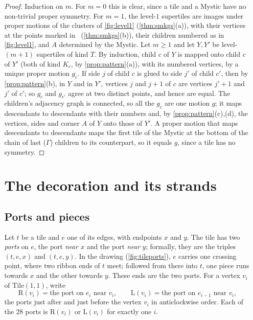 \documentclass[11pt]{amsart}
\theoremstyle{definition}
\theoremstyle{remark}
\newcommand{\Tile}{\mathrm{Tile}(1,1)}
\newcommand{\Lp}{\mathrm L}
\newcommand{\Rp}{\mathrm R}
\begin{document}
\begin{proof}
Induction on $m$. For $m=0$ this is clear, since a tile and a Mystic have no non-trivial proper symmetry. For $m=1$,
the level-$1$ supertiles are images under proper motions of the clusters of \cref{fig:level1} (\cref{thm:smkgs}(a)),
with their vertices at the points marked in~\cite[Fig.~4.1]{SMKGS-spectre} (\cref{thm:smkgs}(b)), their children
numbered as in
\cref{fig:level1}, and $A$ determined by the Mystic. Let $m\ge1$ and let $Y,Y'$ be level-$(m+1)$ supertiles of kind
$T$. By induction, child $c$ of $Y$ is mapped onto child $c$ of $Y'$ (both of kind $K_c$, by \cref{prop:pattern}(a)),
with its numbered vertices, by a unique proper motion $g_c$. If side $j$ of child $c$ is glued to side $j'$ of child
$c'$, then by \cref{prop:pattern}(b), in $Y$ and in $Y'$, vertices $j$ and $j+1$ of $c$ are vertices $j'+1$ and $j'$
of $c'$; so $g_c$ and $g_{c'}$ agree at two distinct points, and hence are equal. The children's adjacency graph is
connected, so all the $g_c$ are one motion $g$; it maps descendants to
descendants with their numbers and, by \cref{prop:pattern}(c),(d), the vertices, sides and corner $A$ of $Y$ onto those
of $Y'$. A proper motion that maps descendants to descendants maps the first tile of the Mystic at the bottom of the
chain of last ($\Gamma$) children to its counterpart, so it equals $g$, since a tile has no symmetry.
\end{proof}

\section{The decoration and its strands}\label{sec:decoration}

\subsection{Ports and pieces}
Let $t$ be a tile and $e$ one of its edges, with endpoints $x$ and $y$. The tile has two \emph{ports} on $e$, the
port \emph{near $x$} and the port \emph{near $y$}; formally, they are the triples $(t,e,x)$ and $(t,e,y)$. In the
drawing (\cref{fig:tileports}), $e$ carries one crossing point, where two ribbon ends of $t$ meet; followed
from there into $t$, one piece runs towards $x$ and the other towards $y$. These ends are the two ports. For a vertex $v_i$ of $\Tile$, write
\[
\Rp(v_i)=\text{the port on } e_i \text{ near } v_i,\qquad \Lp(v_i)=\text{the port on } e_{i-1} \text{ near } v_i ,
\]
the ports just after and just before the vertex $v_i$ in anticlockwise order. Each of the $28$ ports is
$\Rp(v_i)$ or $\Lp(v_i)$ for exactly one $i$.
\end{document}
